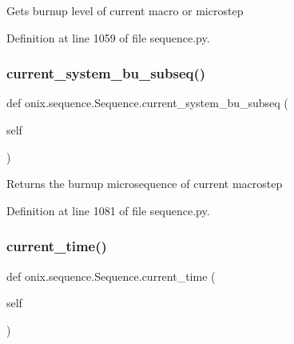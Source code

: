 \begin{DoxyVerb}Gets burnup level of current macro or microstep
\end{DoxyVerb}
 

Definition at line 1059 of file sequence.\+py.

\mbox{\label{classonix_1_1sequence_1_1Sequence_a8372ad59f11b54f4afcab9030a14918e}} 
\subsubsection{\texorpdfstring{current\+\_\+system\+\_\+bu\+\_\+subseq()}{current\_system\_bu\_subseq()}}
{\footnotesize\ttfamily def onix.\+sequence.\+Sequence.\+current\+\_\+system\+\_\+bu\+\_\+subseq (\begin{DoxyParamCaption}\item[{}]{self }\end{DoxyParamCaption})}

\begin{DoxyVerb}Returns the burnup microsequence of current macrostep
\end{DoxyVerb}
 

Definition at line 1081 of file sequence.\+py.

\mbox{\label{classonix_1_1sequence_1_1Sequence_a09111cb428953c0504a7be4f796c1091}} 
\subsubsection{\texorpdfstring{current\+\_\+time()}{current\_time()}\hspace{0.1cm}{\footnotesize\ttfamily [1/2]}}
{\footnotesize\ttfamily def onix.\+sequence.\+Sequence.\+current\+\_\+time (\begin{DoxyParamCaption}\item[{}]{self }\end{DoxyParamCaption})}




